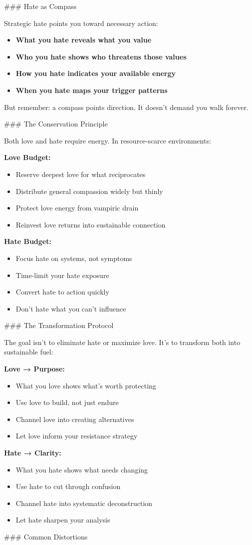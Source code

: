 \documentclass[12pt]{book}
\begin{document}
\#\#\# Hate as Compass

Strategic hate points you toward necessary action:

\begin{itemize}
\item \textbf{What you hate reveals what you value}
\item \textbf{Who you hate shows who threatens those values}
\item \textbf{How you hate indicates your available energy}
\item \textbf{When you hate maps your trigger patterns}

\end{itemize}
But remember: a compass points direction. It doesn't demand you walk forever.

\#\#\# The Conservation Principle

Both love and hate require energy. In resource-scarce environments:

\textbf{Love Budget:}
\begin{itemize}
\item Reserve deepest love for what reciprocates
\item Distribute general compassion widely but thinly
\item Protect love energy from vampiric drain
\item Reinvest love returns into sustainable connection

\end{itemize}
\textbf{Hate Budget:}
\begin{itemize}
\item Focus hate on systems, not symptoms
\item Time-limit your hate exposure
\item Convert hate to action quickly
\item Don't hate what you can't influence

\end{itemize}
\#\#\# The Transformation Protocol

The goal isn't to eliminate hate or maximize love. It's to transform both into sustainable fuel:

\textbf{Love → Purpose:}
\begin{itemize}
\item What you love shows what's worth protecting
\item Use love to build, not just endure
\item Channel love into creating alternatives
\item Let love inform your resistance strategy

\end{itemize}
\textbf{Hate → Clarity:}
\begin{itemize}
\item What you hate shows what needs changing
\item Use hate to cut through confusion
\item Channel hate into systematic deconstruction
\item Let hate sharpen your analysis

\end{itemize}
\#\#\# Common Distortions
\end{document}
